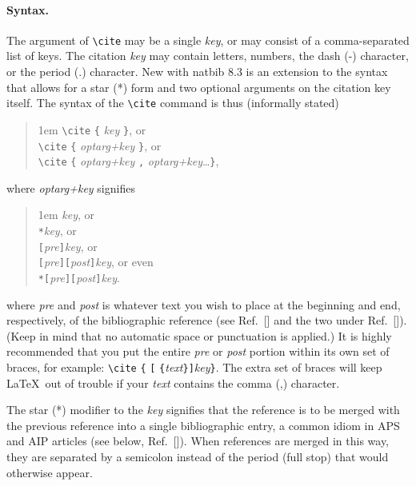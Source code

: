 \documentclass[%
 preprint, linenumbers,
 amsmath,amssymb,
 aps, physrev,
]{revtex4-2}
\begin{document}
\paragraph{Syntax.}
The argument of \verb+\cite+ may be a single \emph{key}, 
or may consist of a comma-separated list of keys.
The citation \emph{key} may contain 
letters, numbers, the dash (-) character, or the period (.) character. 
New with natbib 8.3 is an extension to the syntax that allows for 
a star (*) form and two optional arguments on the citation key itself.
The syntax of the \verb+\cite+ command is thus (informally stated)
\begin{quotation}\flushleft\leftskip1em
\verb+\cite+ \verb+{+ \emph{key} \verb+}+, or\\
\verb+\cite+ \verb+{+ \emph{optarg+key} \verb+}+, or\\
\verb+\cite+ \verb+{+ \emph{optarg+key} \verb+,+ \emph{optarg+key}\ldots \verb+}+,
\end{quotation}\noindent
where \emph{optarg+key} signifies 
\begin{quotation}\flushleft\leftskip1em
\emph{key}, or\\
\texttt{*}\emph{key}, or\\
\texttt{[}\emph{pre}\texttt{]}\emph{key}, or\\
\texttt{[}\emph{pre}\texttt{]}\texttt{[}\emph{post}\texttt{]}\emph{key}, or even\\
\texttt{*}\texttt{[}\emph{pre}\texttt{]}\texttt{[}\emph{post}\texttt{]}\emph{key}.
\end{quotation}\noindent
where \emph{pre} and \emph{post} is whatever text you wish to place 
at the beginning and end, respectively, of the bibliographic reference
(see Ref.~[] and the two under Ref.~[]).
(Keep in mind that no automatic space or punctuation is applied.)
It is highly recommended that you put the entire \emph{pre} or \emph{post} portion 
within its own set of braces, for example: 
\verb+\cite+ \verb+{+ \texttt{[} \verb+{+\emph{text}\verb+}+\texttt{]}\emph{key}\verb+}+.
The extra set of braces will keep \LaTeX\ out of trouble if your \emph{text} contains the comma (,) character.

The star (*) modifier to the \emph{key} signifies that the reference is to be 
merged with the previous reference into a single bibliographic entry, 
a common idiom in APS and AIP articles (see below, Ref.~[]). 
When references are merged in this way, they are separated by a semicolon instead of 
the period (full stop) that would otherwise appear.
\end{document}
